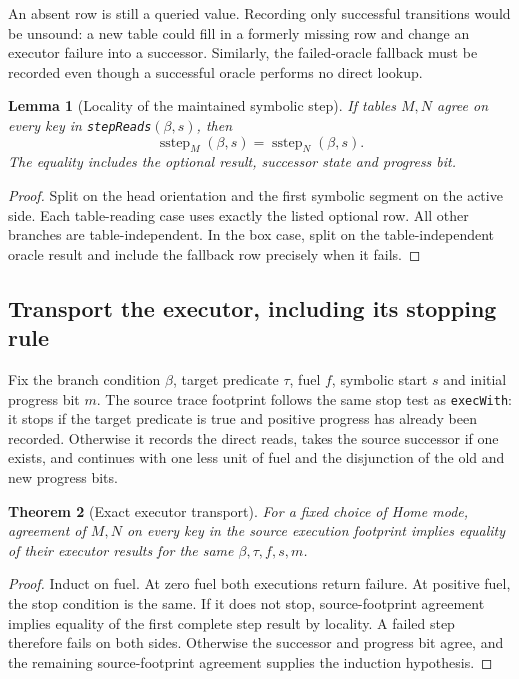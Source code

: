 \documentclass[11pt]{article}
\newtheorem{theorem}{Theorem}[section]
\newtheorem{lemma}[theorem]{Lemma}
\theoremstyle{definition}\newtheorem{definition}[theorem]{Definition}
\newcommand{\code}[1]{\texttt{#1}}
\begin{document}
An absent row is still a queried value. Recording only successful transitions
would be unsound: a new table could fill in a formerly missing row and change
an executor failure into a successor. Similarly, the failed-oracle fallback
must be recorded even though a successful oracle performs no direct lookup.

\begin{lemma}[Locality of the maintained symbolic step]
If tables \(M,N\) agree on every key in \code{stepReads}$(\beta,s)$, then
\[
  \operatorname{sstep}_M(\beta,s)
   =\operatorname{sstep}_N(\beta,s).
\]
The equality includes the optional result, successor state and progress bit.
\end{lemma}
\begin{proof}
Split on the head orientation and the first symbolic segment on the active
side. Each table-reading case uses exactly the listed optional row. All other
branches are table-independent. In the box case, split on the table-independent
oracle result and include the fallback row precisely when it fails.
\end{proof}

\subsection{Transport the executor, including its stopping rule}

Fix the branch condition \(\beta\), target predicate \(\tau\), fuel \(f\),
symbolic start \(s\) and initial progress bit \(m\). The source trace footprint
follows the same stop test as \code{execWith}: it stops if the target predicate
is true and positive progress has already been recorded. Otherwise it records
the direct reads, takes the source successor if one exists, and continues with
one less unit of fuel and the disjunction of the old and new progress bits.

\begin{theorem}[Exact executor transport]
For a fixed choice of Home mode, agreement of \(M,N\) on every key in the
source execution footprint implies equality of their executor results for the
same \(\beta,\tau,f,s,m\).
\end{theorem}
\begin{proof}
Induct on fuel. At zero fuel both executions return failure. At positive fuel,
the stop condition is the same. If it does not stop, source-footprint agreement
implies equality of the first complete step result by locality. A failed step
therefore fails on both sides. Otherwise the successor and progress bit agree,
and the remaining source-footprint agreement supplies the induction hypothesis.
\end{proof}
\end{document}
